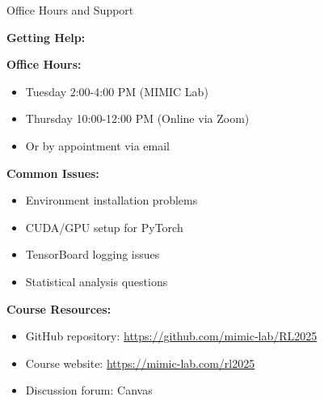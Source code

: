 \documentclass[aspectratio=169,10pt]{beamer}
\begin{document}
\begin{frame}{Office Hours and Support}

\textbf{Getting Help:}

\vfill

\textbf{Office Hours:}
\begin{itemize}
    \item Tuesday 2:00-4:00 PM (MIMIC Lab)
    \item Thursday 10:00-12:00 PM (Online via Zoom)
    \item Or by appointment via email
\end{itemize}

\vfill

\textbf{Common Issues:}
\begin{itemize}
    \item Environment installation problems
    \item CUDA/GPU setup for PyTorch
    \item TensorBoard logging issues
    \item Statistical analysis questions
\end{itemize}

\vfill

\textbf{Course Resources:}
\begin{itemize}
    \item GitHub repository: \url{https://github.com/mimic-lab/RL2025}
    \item Course website: \url{https://mimic-lab.com/rl2025}
    \item Discussion forum: Canvas
\end{itemize}

\end{frame}
\end{document}
